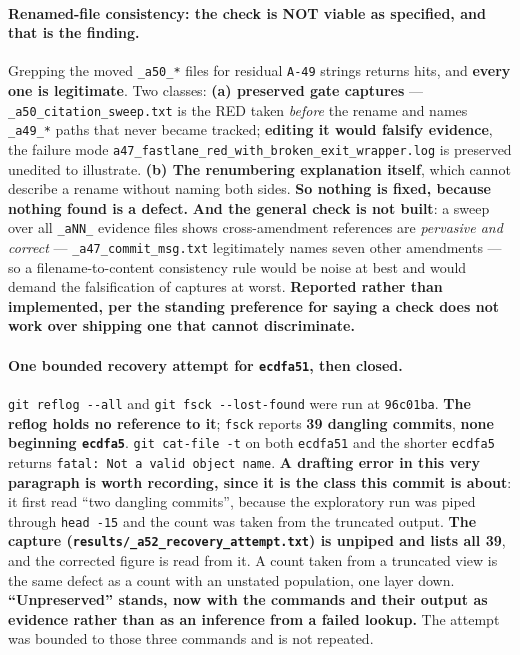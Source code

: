 \documentclass[
  10pt,
]{article}
\begin{document}
\paragraph{Renamed-file consistency: the check is NOT viable as specified, and that is the finding.}
Grepping the moved \texttt{\_a50\_*} files for residual \texttt{A-49} strings returns hits, and \textbf{every one is legitimate}. Two classes: \textbf{(a) preserved gate captures} --- \texttt{\_a50\_citation\_sweep.txt} is the RED taken \emph{before} the rename and names \texttt{\_a49\_*} paths that never became tracked; \textbf{editing it would falsify evidence}, the failure mode \texttt{a47\_fastlane\_red\_with\_broken\_exit\_wrapper.log} is preserved unedited to illustrate. \textbf{(b) The renumbering explanation itself}, which cannot describe a rename without naming both sides. \textbf{So nothing is fixed, because nothing found is a defect.} \textbf{And the general check is not built}: a sweep over all \texttt{\_aNN\_} evidence files shows cross-amendment references are \emph{pervasive and correct} --- \texttt{\_a47\_commit\_msg.txt} legitimately names seven other amendments --- so a filename-to-content consistency rule would be noise at best and would demand the falsification of captures at worst. \textbf{Reported rather than implemented, per the standing preference for saying a check does not work over shipping one that cannot discriminate.}

\paragraph{One bounded recovery attempt for \texttt{ecdfa51}, then closed.}
\texttt{git reflog -{}-all} and \texttt{git fsck -{}-lost-found} were run at \texttt{96c01ba}. \textbf{The reflog holds no reference to it}; \texttt{fsck} reports \textbf{39 dangling commits}, \textbf{none beginning \texttt{ecdfa5}}. \texttt{git cat-file -t} on both \texttt{ecdfa51} and the shorter \texttt{ecdfa5} returns \texttt{fatal: Not a valid object name}. \textbf{A drafting error in this very paragraph is worth recording, since it is the class this commit is about}: it first read ``two dangling commits'', because the exploratory run was piped through \texttt{head -15} and the count was taken from the truncated output. \textbf{The capture (\texttt{results/\allowbreak{}\_a52\_recovery\_attempt.txt}) is unpiped and lists all 39}, and the corrected figure is read from it. A count taken from a truncated view is the same defect as a count with an unstated population, one layer down. \textbf{``Unpreserved'' stands, now with the commands and their output as evidence rather than as an inference from a failed lookup.} The attempt was bounded to those three commands and is not repeated.
\end{document}
